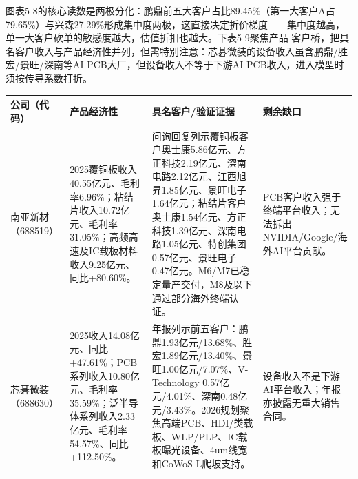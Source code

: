 图表5-8的核心读数是两极分化：鹏鼎前五大客户占比89.45\%（第一大客户A占79.65\%）与兴森27.29\%形成集中度两极，这直接决定折价梯度——集中度越高，单一大客户砍单的敏感度越大，估值折扣也越大。下表5-9聚焦产品-客户桥，把具名客户收入与产品经济性并列，但需特别注意：芯碁微装的设备收入虽含鹏鼎/胜宏/景旺/深南等AI PCB大厂，但设备收入不等于下游AI PCB收入，进入模型时须按传导系数打折。

\begin{exhibitbox}
\footnotesize
\begin{tabularx}{\textwidth}{L{1.8cm}X X X}
\toprule
\textbf{公司（代码）} & \textbf{产品经济性} & \textbf{具名客户/验证证据} & \textbf{剩余缺口} \\
\midrule
南亚新材（688519） & 2025覆铜板收入40.55亿元、毛利率6.96\%；粘结片收入10.72亿元、毛利率31.05\%；高频高速及IC载板材料收入9.25亿元、同比+80.60\%。 & 问询回复列示覆铜板客户奥士康5.86亿元、方正科技2.19亿元、深南电路2.12亿元、江西旭昇1.85亿元、景旺电子1.64亿元；粘结片客户奥士康1.54亿元、方正科技1.39亿元、深南电路1.05亿元、特创集团0.57亿元、景旺电子0.47亿元。M6/M7已稳定量产交付，M8及以下通过部分海外终端认证。 & PCB客户收入强于终端平台收入；无法拆出NVIDIA/Google/海外AI平台贡献。 \\
芯碁微装（688630） & 2025收入14.08亿元、同比+47.61\%；PCB系列收入10.80亿元、毛利率35.59\%；泛半导体系列收入2.33亿元、毛利率54.57\%、同比+112.50\%。 & 年报列示前五客户：鹏鼎1.93亿元/13.68\%、胜宏1.89亿元/13.40\%、景旺1.00亿元/7.07\%、V-Technology 0.57亿元/4.01\%、深南0.48亿元/3.43\%。2026规划聚焦高端PCB、HDI/类载板、WLP/PLP、IC载板曝光设备、4um线宽和CoWoS-L爬坡支持。 & 设备收入不是下游AI平台收入；年报亦披露无重大销售合同。 \\
\bottomrule
\end{tabularx}
\end{exhibitbox}

